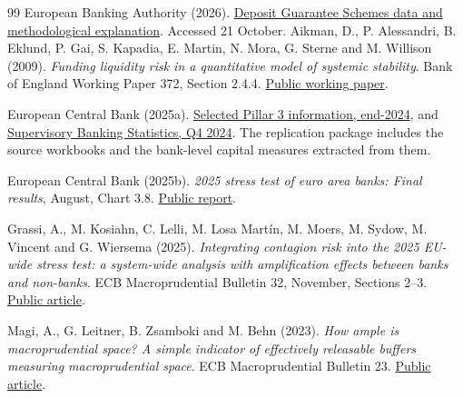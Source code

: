 \begin{thebibliography}{99}
European Banking Authority (2026). \href{https://www.eba.europa.eu/activities/single-rulebook/regulatory-activities/depositor-protection/deposit-guarantee-schemes-data}{Deposit Guarantee Schemes data and methodological explanation}. Accessed 21 October.
Aikman, D., P. Alessandri, B. Eklund, P. Gai, S. Kapadia, E. Martin, N. Mora, G. Sterne and M. Willison (2009). \emph{Funding liquidity risk in a quantitative model of systemic stability}. Bank of England Working Paper 372, Section 2.4.4. \href{https://www.bankofengland.co.uk/-/media/boe/files/working-paper/2009/funding-liquidity-risk-in-a-quantitative-model-of-systemic-stability.pdf}{Public working paper}.

European Central Bank (2025a). \href{https://www.bankingsupervision.europa.eu/home/doc/ssm.doc202512_pillar3information.en.xlsx}{Selected Pillar 3 information, end-2024}, and \href{https://www.bankingsupervision.europa.eu/press/other-publications/supervisorybankingstats/pdf/ssm.interactivelayout_fourth_quarter_2024_202503.en.xlsx}{Supervisory Banking Statistics, Q4 2024}. The replication package includes the source workbooks and the bank-level capital measures extracted from them.

European Central Bank (2025b). \emph{2025 stress test of euro area banks: Final results}, August, Chart 3.8. \href{https://www.bankingsupervision.europa.eu/ecb/pub/pdf/ssm.Report_2025_Stress_Test_202508.en.pdf}{Public report}.

Grassi, A., M. Kosiahn, C. Lelli, M. Losa Mart{\'i}n, M. Moers, M. Sydow, M. Vincent and G. Wiersema (2025). \emph{Integrating contagion risk into the 2025 EU-wide stress test: a system-wide analysis with amplification effects between banks and non-banks}. ECB Macroprudential Bulletin 32, November, Sections 2--3. \href{https://www.ecb.europa.eu/press/financial-stability-publications/macroprudential-bulletin/html/ecb.mpbu202511_03.en.html}{Public article}.

Magi, A., G. Leitner, B. Zsamboki and M. Behn (2023). \emph{How ample is macroprudential space? A simple indicator of effectively releasable buffers measuring macroprudential space}. ECB Macroprudential Bulletin 23. \href{https://www.ecb.europa.eu/press/financial-stability-publications/macroprudential-bulletin/focus/2023/html/ecb.mpbu202312_focus03.en.html}{Public article}.


\end{thebibliography}
